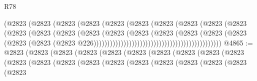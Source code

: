 \begin{lexlean}{R78}
\begin{coremodule}
                                                    (@2823
                                                      (@2823
                                                        (@2823
                                                          (@2823
                                                            (@2823
                                                              (@2823
                                                                (@2823
                                                                  (@2823
                                                                    (@2823
                                                                      (@2823
                                                                        (@2823
                                                                          (@2823
                                                                            (@2823
                                                                              (@2823
                                                                                (@2823
                                                                                  (@2823
                                                                                    (@2823
                                                                                      (@2823
                                                                                        (@2823
                                                                                          (@2823
                                                                                            (@2823
                                                                                              (@2823
                                                                                                (@2823
                                                                                                  @226)))))))))))))))))))))))))))))))))))))))))))))))
@4865 := @2823
    (@2823
      (@2823
        (@2823
          (@2823
            (@2823
              (@2823
                (@2823
                  (@2823
                    (@2823
                      (@2823
                        (@2823
                          (@2823
                            (@2823
                              (@2823
                                (@2823
                                  (@2823
                                    (@2823
                                      (@2823
                                        (@2823
                                          (@2823

\end{coremodule}
\end{lexlean}
